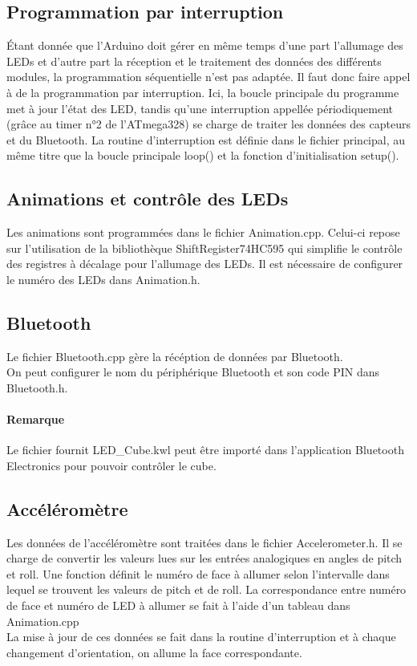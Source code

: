 \documentclass{article}
\begin{document}
\subsection{Programmation par interruption}
Étant donnée que l'Arduino doit gérer en même temps d'une part l'allumage des LEDs et d'autre part la réception et le traitement des données des différents modules, la programmation séquentielle n'est pas adaptée. Il faut donc faire appel à de la programmation par interruption. Ici, la boucle principale du programme met à jour l'état des LED, tandis qu'une interruption appellée périodiquement (grâce au timer n°2 de l'ATmega328) se charge de traiter les données des capteurs et du Bluetooth. La routine d'interruption est définie dans le fichier principal, au même titre que la boucle principale loop() et la fonction d'initialisation setup().

\subsection{Animations et contrôle des LEDs}
Les animations sont programmées dans le fichier Animation.cpp. Celui-ci repose sur l'utilisation de la bibliothèque ShiftRegister74HC595 qui simplifie le contrôle des registres à décalage pour l'allumage des LEDs. Il est nécessaire de configurer le numéro des LEDs dans Animation.h.

\subsection{Bluetooth}
Le fichier Bluetooth.cpp gère la récéption de données par Bluetooth.\\
On peut configurer le nom du périphérique Bluetooth et son code PIN dans Bluetooth.h.

\paragraph{Remarque} Le fichier fournit LED\_Cube.kwl peut être importé dans l'application Bluetooth Electronics pour pouvoir contrôler le cube.

\subsection{Accéléromètre}
Les données de l'accéléromètre sont traitées dans le fichier Accelerometer.h. Il se charge de convertir les valeurs lues sur les entrées analogiques en angles de pitch et roll. Une fonction définit le numéro de face à allumer selon l'intervalle dans lequel se trouvent les valeurs de pitch et de roll. La correspondance entre numéro de face et numéro de LED à allumer se fait à l'aide d'un tableau dans Animation.cpp\\
La mise à jour de ces données se fait dans la routine d'interruption et à chaque changement d'orientation, on allume la face correspondante.
\end{document}

